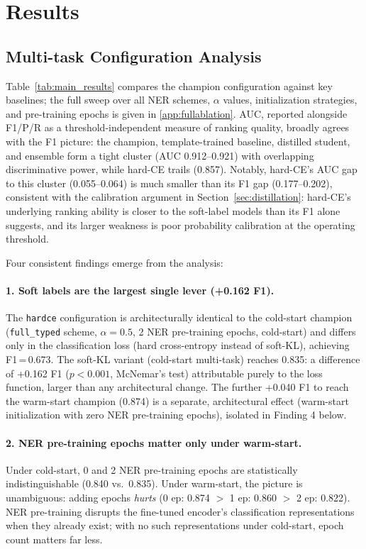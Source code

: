 \documentclass[a4paper,fleqn]{cas-sc}
\begin{document}
\section{Results}
\label{sec:results}

\subsection{Multi-task Configuration Analysis}

Table~\ref{tab:main_results} compares the champion configuration against
key baselines; the full sweep over all NER schemes, $\alpha$ values,
initialization strategies, and pre-training epochs is given in
\ref{app:fullablation}. AUC, reported alongside F1/P/R as a
threshold-independent measure of ranking quality, broadly agrees with
the F1 picture: the champion, template-trained baseline, distilled
student, and ensemble form a tight cluster (AUC 0.912--0.921) with
overlapping discriminative power, while hard-CE trails (0.857).
Notably, hard-CE's AUC gap to this cluster (0.055--0.064) is much
smaller than its F1 gap (0.177--0.202), consistent with the calibration
argument in Section~\ref{sec:distillation}: hard-CE's underlying ranking
ability is closer to the soft-label models than its F1 alone suggests,
and its larger weakness is poor probability calibration at the
operating threshold.

Four consistent findings emerge from the analysis:

\paragraph{1. Soft labels are the largest single lever (+0.162 F1).}
The \texttt{hardce} configuration is architecturally identical to the
cold-start champion (\texttt{full\_typed} scheme, $\alpha{=}0.5$,
2 NER pre-training epochs, cold-start) and differs only in the
classification loss (hard cross-entropy instead of soft-KL), achieving
F1\,=\,0.673. The soft-KL variant (cold-start multi-task) reaches 0.835:
a difference of +0.162 F1 ($p{<}0.001$, McNemar's test) attributable
purely to the loss function, larger than any architectural change.
The further +0.040 F1 to reach the warm-start champion (0.874) is a
separate, architectural effect (warm-start initialization with zero
NER pre-training epochs), isolated in Finding 4 below.

\paragraph{2. NER pre-training epochs matter only under warm-start.}
Under cold-start, 0 and 2 NER pre-training epochs are statistically
indistinguishable (0.840 vs.\ 0.835). Under warm-start, the picture is
unambiguous: adding epochs \emph{hurts} (0 ep: 0.874 $>$ 1 ep: 0.860 $>$
2 ep: 0.822). NER pre-training disrupts the fine-tuned encoder's
classification representations when they already exist; with no such
representations under cold-start, epoch count matters far less.
\end{document}
